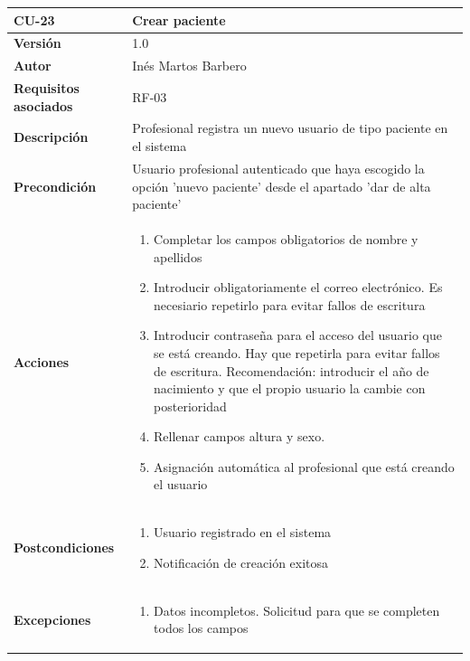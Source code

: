 \begin{table}[p]
	\centering
	\begin{tabularx}{\linewidth}{ p{} p{} }
		\toprule
		\textbf{CU-23}    & \textbf{Crear paciente}\\
		\toprule
		\textbf{Versión}              & 1.0    \\
		\textbf{Autor}                & Inés Martos Barbero \\
		\textbf{Requisitos asociados} & RF-03 \\
		\textbf{Descripción}          & Profesional registra un nuevo usuario de tipo paciente en el sistema \\
		\textbf{Precondición}         & Usuario profesional autenticado que haya escogido la opción 'nuevo paciente' desde el apartado 'dar de alta paciente' \\
		\textbf{Acciones}             &
		\begin{enumerate}
			\def\labelenumi{\arabic{enumi}.}
			\tightlist
			\item Completar los campos obligatorios de nombre y apellidos
            \item Introducir obligatoriamente el correo electrónico. Es necesiario repetirlo para evitar fallos de escritura
            \item Introducir contraseña para el acceso del usuario que se está creando. Hay que repetirla para evitar fallos de escritura. Recomendación: introducir el año de nacimiento y que el propio usuario la cambie con posterioridad
			\item Rellenar campos altura y sexo.
            \item Asignación automática al profesional que está creando el usuario
		\end{enumerate}\\
		\textbf{Postcondiciones}        & 
        \begin{enumerate}
			\def\labelenumi{\arabic{enumi}.}
			\tightlist
			\item Usuario registrado en el sistema
            \item Notificación de creación exitosa
		\end{enumerate}\\
		\textbf{Excepciones}          & 
        \begin{enumerate}
			\def\labelenumi{\arabic{enumi}.}
			\tightlist
			\item Datos incompletos. Solicitud para que se completen todos los campos

\end{enumerate}
\end{tabularx}
\end{table}
